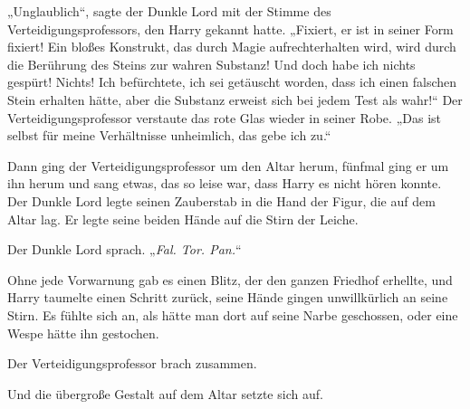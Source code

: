 „Unglaublich“, sagte der Dunkle Lord mit der Stimme des Verteidigungsprofessors, den Harry gekannt hatte. „Fixiert, er ist in seiner Form fixiert! Ein bloßes Konstrukt, das durch Magie aufrechterhalten wird, wird durch die Berührung des Steins zur wahren Substanz! Und doch habe ich nichts gespürt! Nichts! Ich befürchtete, ich sei getäuscht worden, dass ich einen falschen Stein erhalten hätte, aber die Substanz erweist sich bei jedem Test als wahr!“
Der Verteidigungsprofessor verstaute das rote Glas wieder in seiner Robe.
„Das ist selbst für meine Verhältnisse unheimlich, das gebe ich zu.“

Dann ging der Verteidigungsprofessor um den Altar herum, fünfmal ging er um ihn herum und sang etwas, das so leise war, dass Harry es nicht hören konnte.
Der Dunkle Lord legte seinen Zauberstab in die Hand der Figur, die auf dem Altar lag.
Er legte seine beiden Hände auf die Stirn der Leiche.

Der Dunkle Lord sprach. „\emph{Fal. Tor. Pan.}“

Ohne jede Vorwarnung gab es einen Blitz, der den ganzen Friedhof erhellte, und Harry taumelte einen Schritt zurück, seine Hände gingen unwillkürlich an seine Stirn.
Es fühlte sich an, als hätte man dort auf seine Narbe geschossen, oder eine Wespe hätte ihn gestochen.

Der Verteidigungsprofessor brach zusammen.

Und die übergroße Gestalt auf dem Altar setzte sich auf.

